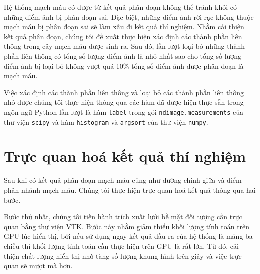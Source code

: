 	Hệ thống mạch máu có được từ kết quả phân đoạn không thể tránh khỏi có những điểm ảnh bị phân đoạn sai. Đặc biệt, những điểm ảnh rời rạc không thuộc mạch máu bị phân đoạn sai sẽ làm xấu đi kết quả thí nghiệm. Nhằm cải thiện kết quả phân đoạn, chúng tôi đề xuất thực hiện xác định các thành phần liên thông trong cây mạch máu được sinh ra. Sau đó, lần lượt loại bỏ những thành phần liên thông có tổng số lượng điểm ảnh là nhỏ nhất sao cho tổng số lượng điểm ảnh bị loại bỏ không vượt quá 10\% tổng số điểm ảnh được phân đoạn là mạch máu. 
	
	Việc xác định các thành phần liên thông và loại bỏ các thành phần liên thông nhỏ được chúng tôi thực hiện thông qua các hàm đã được hiện thực sẵn trong ngôn ngữ Python lần lượt là hàm \verb/label/ trong gói \verb/ndimage.measurements/ của thư viện \verb/scipy/ và hàm \verb/histogram/ và \verb/argsort/ của thư viện \verb/numpy/.
	
\newpage
\section{Trực quan hoá kết quả thí nghiệm} 
\label{sec:truc_quan_hoa_ket_qua_thi_nghiem}
	Sau khi có kết quả phân đoạn mạch máu cũng như đường chính giữa và điểm phân nhánh mạch máu. Chúng tôi thực hiện trực quan hoá kết quả thông qua hai bước.
	
	Bước thứ nhất, chúng tôi tiến hành trích xuất lưới bề mặt đối tượng cần trực quan bằng thư viện VTK. Bước này nhằm giảm thiểu khối lượng tính toán trên GPU lúc hiển thị, bởi nếu sử dụng ngay kết quả đầu ra của hệ thống là mảng ba chiều thì khối lượng tính toán cần thực hiện trên GPU là rất lớn. Từ đó, cải thiện chất lượng hiển thị nhờ tăng số lượng khung hình trên giây và việc trực quan sẽ mượt mà hơn.
	
